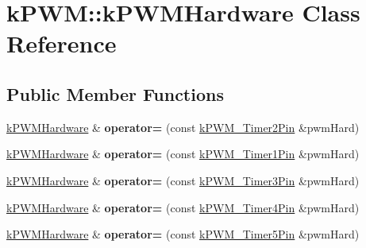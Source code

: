 \hypertarget{classkPWM_1_1kPWMHardware}{}\section{k\+P\+WM\+:\+:k\+P\+W\+M\+Hardware Class Reference}
\label{classkPWM_1_1kPWMHardware}
\subsection*{Public Member Functions}
\begin{DoxyCompactItemize}
\item 
\hyperlink{classkPWM_1_1kPWMHardware}{k\+P\+W\+M\+Hardware} \& {\bfseries operator=} (const \hyperlink{structkPWM__Timer2Pin}{k\+P\+W\+M\+\_\+\+Timer2\+Pin} \&pwm\+Hard)\hypertarget{classkPWM_1_1kPWMHardware_acb4fbda01dac038bf5dfca605dfab0ef}{}\label{classkPWM_1_1kPWMHardware_acb4fbda01dac038bf5dfca605dfab0ef}

\item 
\hyperlink{classkPWM_1_1kPWMHardware}{k\+P\+W\+M\+Hardware} \& {\bfseries operator=} (const \hyperlink{structkPWM__Timer1Pin}{k\+P\+W\+M\+\_\+\+Timer1\+Pin} \&pwm\+Hard)\hypertarget{classkPWM_1_1kPWMHardware_abca1d455a282789e17966d90934f73ef}{}\label{classkPWM_1_1kPWMHardware_abca1d455a282789e17966d90934f73ef}

\item 
\hyperlink{classkPWM_1_1kPWMHardware}{k\+P\+W\+M\+Hardware} \& {\bfseries operator=} (const \hyperlink{structkPWM__Timer3Pin}{k\+P\+W\+M\+\_\+\+Timer3\+Pin} \&pwm\+Hard)\hypertarget{classkPWM_1_1kPWMHardware_af058989fe3c27a15315764f353ce195b}{}\label{classkPWM_1_1kPWMHardware_af058989fe3c27a15315764f353ce195b}

\item 
\hyperlink{classkPWM_1_1kPWMHardware}{k\+P\+W\+M\+Hardware} \& {\bfseries operator=} (const \hyperlink{structkPWM__Timer4Pin}{k\+P\+W\+M\+\_\+\+Timer4\+Pin} \&pwm\+Hard)\hypertarget{classkPWM_1_1kPWMHardware_aea1806117cf165398e6664a3413d2107}{}\label{classkPWM_1_1kPWMHardware_aea1806117cf165398e6664a3413d2107}

\item 
\hyperlink{classkPWM_1_1kPWMHardware}{k\+P\+W\+M\+Hardware} \& {\bfseries operator=} (const \hyperlink{structkPWM__Timer5Pin}{k\+P\+W\+M\+\_\+\+Timer5\+Pin} \&pwm\+Hard)\hypertarget{classkPWM_1_1kPWMHardware_a496e6d4d882369ddf5069842f4e0364e}{}\label{classkPWM_1_1kPWMHardware_a496e6d4d882369ddf5069842f4e0364e}


\end{DoxyCompactItemize}
